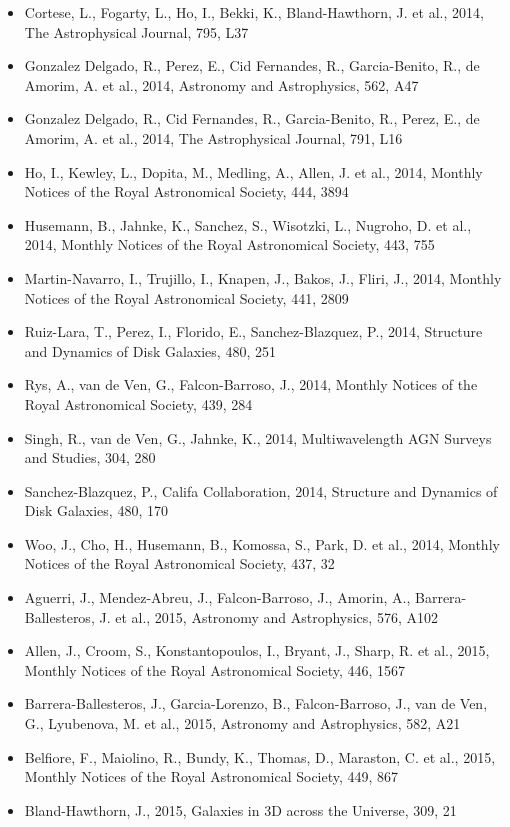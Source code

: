\documentclass{letter}
\begin{document}
\begin{enumerate}
\begin{itemize}
\item Cortese, L., Fogarty, L., Ho, I., Bekki, K., Bland-Hawthorn, J. et al., 2014, The Astrophysical Journal, 795, L37
\item Gonzalez Delgado, R., Perez, E., Cid Fernandes, R., Garcia-Benito, R., de Amorim, A. et al., 2014, Astronomy and Astrophysics, 562, A47
\item Gonzalez Delgado, R., Cid Fernandes, R., Garcia-Benito, R., Perez, E., de Amorim, A. et al., 2014, The Astrophysical Journal, 791, L16
\item Ho, I., Kewley, L., Dopita, M., Medling, A., Allen, J. et al., 2014, Monthly Notices of the Royal Astronomical Society, 444, 3894
\item Husemann, B., Jahnke, K., Sanchez, S., Wisotzki, L., Nugroho, D. et al., 2014, Monthly Notices of the Royal Astronomical Society, 443, 755
\item Martin-Navarro, I., Trujillo, I., Knapen, J., Bakos, J., Fliri, J., 2014, Monthly Notices of the Royal Astronomical Society, 441, 2809
\item Ruiz-Lara, T., Perez, I., Florido, E., Sanchez-Blazquez, P., 2014, Structure and Dynamics of Disk Galaxies, 480, 251
\item Rys, A., van de Ven, G., Falcon-Barroso, J., 2014, Monthly Notices of the Royal Astronomical Society, 439, 284
\item Singh, R., van de Ven, G., Jahnke, K., 2014, Multiwavelength AGN Surveys and Studies, 304, 280
\item Sanchez-Blazquez, P., Califa Collaboration, 2014, Structure and Dynamics of Disk Galaxies, 480, 170
\item Woo, J., Cho, H., Husemann, B., Komossa, S., Park, D. et al., 2014, Monthly Notices of the Royal Astronomical Society, 437, 32
\item Aguerri, J., Mendez-Abreu, J., Falcon-Barroso, J., Amorin, A., Barrera-Ballesteros, J. et al., 2015, Astronomy and Astrophysics, 576, A102
\item Allen, J., Croom, S., Konstantopoulos, I., Bryant, J., Sharp, R. et al., 2015, Monthly Notices of the Royal Astronomical Society, 446, 1567
\item Barrera-Ballesteros, J., Garcia-Lorenzo, B., Falcon-Barroso, J., van de Ven, G., Lyubenova, M. et al., 2015, Astronomy and Astrophysics, 582, A21
\item Belfiore, F., Maiolino, R., Bundy, K., Thomas, D., Maraston, C. et al., 2015, Monthly Notices of the Royal Astronomical Society, 449, 867
\item Bland-Hawthorn, J., 2015, Galaxies in 3D across the Universe, 309, 21

\end{itemize}
\end{enumerate}
\end{document}
